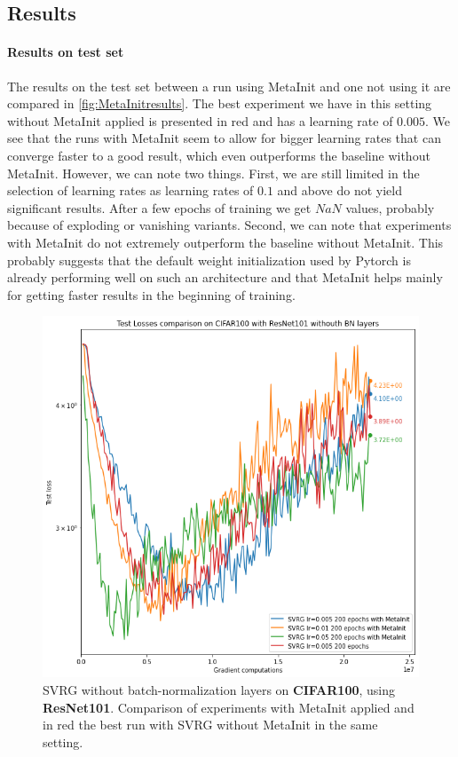 \documentclass[a4paper,11pt,oneside]{report}
\begin{document}
\subsection{Results}
\paragraph{Results on test set}
The results on the test set between a run using MetaInit and one not using it are compared in \autoref{fig:MetaInitresults}. The best experiment we have in this setting without MetaInit applied is presented in red and has a learning rate of $0.005$. We see that the runs with MetaInit seem to allow for bigger learning rates that can converge faster to a good result, which even outperforms the baseline without MetaInit. However, we can note two things. First, we are still limited in the selection of learning rates as learning rates of $0.1$ and above do not yield significant results. After a few epochs of training we get $NaN$ values, probably because of exploding or vanishing variants. Second, we can note that experiments with MetaInit do not extremely outperform the baseline without MetaInit.
This probably suggests that the default weight initialization used by Pytorch is already performing well on such an architecture and that MetaInit helps mainly for getting faster results in the beginning of training. 

\begin{figure}
    \centering
    \includegraphics[width=.7\columnwidth]{report/figures/MetaInit_results_final.png}
    \caption{SVRG without batch-normalization layers on \textbf{CIFAR100}, using \textbf{ResNet101}. Comparison of experiments with MetaInit applied and in red the best run with SVRG without MetaInit in the same setting.}
    \label{fig:MetaInitresults}
\end{figure}
\end{document}
